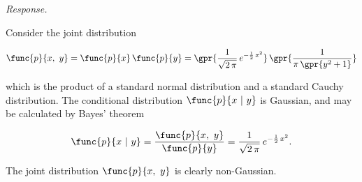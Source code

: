 \textit{Response.} 

Consider the joint distribution

\begin{equation}
	\func{p}{x,\ y} = \func{p}{x}\,\func{p}{y} = \gpr{\frac{1}{\sqrt{2\,\pi}}\,e^{-\frac{1}{2}\,x^2}}\,\gpr{\frac{1}{\pi\,\gpr{y^2 + 1}}}
\end{equation}

which is the product of a standard normal distribution and a standard Cauchy distribution. The conditional distribution $\func{p}{x\ \vert\ y}$ is Gaussian, and may be calculated by Bayes' theorem

\begin{equation}
	\func{p}{x\ \vert\ y} = \frac{\func{p}{x,\ y}}{\func{p}{y}} = \frac{1}{\sqrt{2\,\pi}}\,e^{-\frac{1}{2}\,x^2}.
\end{equation}
	
The joint distribution $\func{p}{x,\ y}$ is clearly non-Gaussian.
